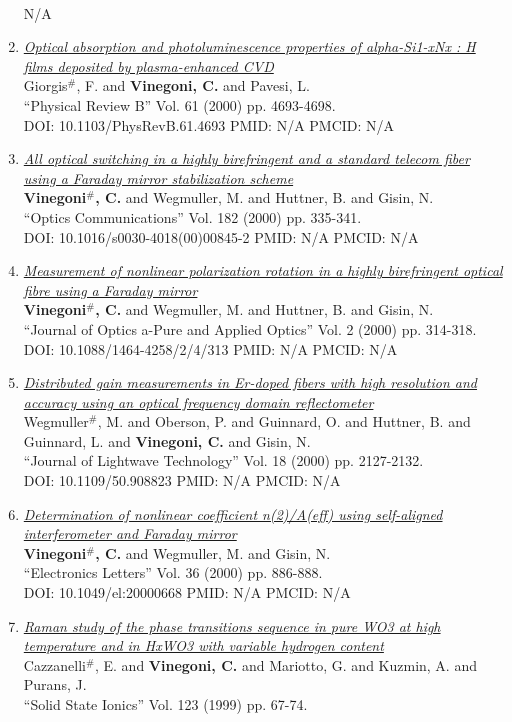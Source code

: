 \documentclass{resume}
\begin{document}
\begin{category}{~~}
\begin{enumerate}
N/A\item \href{https://cvinegoni.github.io/assets/pdf/papers/2000-PRB.pdf}{\it  Optical absorption and photoluminescence properties of alpha-Si1-xNx : H films deposited by plasma-enhanced CVD} \\ Giorgis$^\#$, F. and {\bf Vinegoni, C.} and Pavesi, L. \\ ``Physical Review B'' Vol. 61 (2000) pp. 4693-4698. \\ DOI: 10.1103/PhysRevB.61.4693 PMID: N/A PMCID: N/A\item \href{https://cvinegoni.github.io/assets/pdf/papers/2000-OC.pdf}{\it  All optical switching in a highly birefringent and a standard telecom fiber using a Faraday mirror stabilization scheme} \\ {\bf Vinegoni$^\#$, C.} and Wegmuller, M. and Huttner, B. and Gisin, N. \\ ``Optics Communications'' Vol. 182 (2000) pp. 335-341. \\ DOI: 10.1016/s0030-4018(00)00845-2 PMID: N/A PMCID: N/A\item \href{https://cvinegoni.github.io/assets/pdf/papers/2000-JOA.pdf}{\it  Measurement of nonlinear polarization rotation in a highly birefringent optical fibre using a Faraday mirror} \\ {\bf Vinegoni$^\#$, C.} and Wegmuller, M. and Huttner, B. and Gisin, N. \\ ``Journal of Optics a-Pure and Applied Optics'' Vol. 2 (2000) pp. 314-318. \\ DOI: 10.1088/1464-4258/2/4/313 PMID: N/A PMCID: N/A\item \href{https://cvinegoni.github.io/assets/pdf/papers/2000-JLT.pdf}{\it  Distributed gain measurements in Er-doped fibers with high resolution and accuracy using an optical frequency domain reflectometer} \\ Wegmuller$^\#$, M. and Oberson, P. and Guinnard, O. and Huttner, B. and Guinnard, L. and {\bf Vinegoni, C.} and Gisin, N. \\ ``Journal of Lightwave Technology'' Vol. 18 (2000) pp. 2127-2132. \\ DOI: 10.1109/50.908823 PMID: N/A PMCID: N/A\item \href{https://cvinegoni.github.io/assets/pdf/papers/2000-EL.pdf}{\it  Determination of nonlinear coefficient n(2)/A(eff) using self-aligned interferometer and Faraday mirror} \\ {\bf Vinegoni$^\#$, C.} and Wegmuller, M. and Gisin, N. \\ ``Electronics Letters'' Vol. 36 (2000) pp. 886-888. \\ DOI: 10.1049/el:20000668 PMID: N/A PMCID: N/A\item \href{https://cvinegoni.github.io/assets/pdf/papers/1999-SSI.pdf}{\it  Raman study of the phase transitions sequence in pure WO3 at high temperature and in HxWO3 with variable hydrogen content} \\ Cazzanelli$^\#$, E. and {\bf Vinegoni, C.} and Mariotto, G. and Kuzmin, A. and Purans, J. \\ ``Solid State Ionics'' Vol. 123 (1999) pp. 67-74. 
\end{enumerate}
\end{category}
\end{document}
